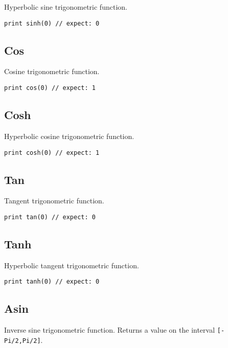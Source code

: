 Hyperbolic sine trigonometric function.

\begin{lstlisting}
print sinh(0) // expect: 0 
\end{lstlisting}

\hypertarget{cos}{%
\subsection{Cos}\label{cos}}

Cosine trigonometric function.

\begin{lstlisting}
print cos(0) // expect: 1
\end{lstlisting}

\hypertarget{cosh}{%
\subsection{Cosh}\label{cosh}}

Hyperbolic cosine trigonometric function.

\begin{lstlisting}
print cosh(0) // expect: 1
\end{lstlisting}

\hypertarget{tan}{%
\subsection{Tan}\label{tan}}

Tangent trigonometric function.

\begin{lstlisting}
print tan(0) // expect: 0 
\end{lstlisting}

\hypertarget{tanh}{%
\subsection{Tanh}\label{tanh}}

Hyperbolic tangent trigonometric function.

\begin{lstlisting}
print tanh(0) // expect: 0 
\end{lstlisting}

\hypertarget{asin}{%
\subsection{Asin}\label{asin}}

Inverse sine trigonometric function. Returns a value on the interval
\texttt{{[}-Pi/2,Pi/2{]}}.

